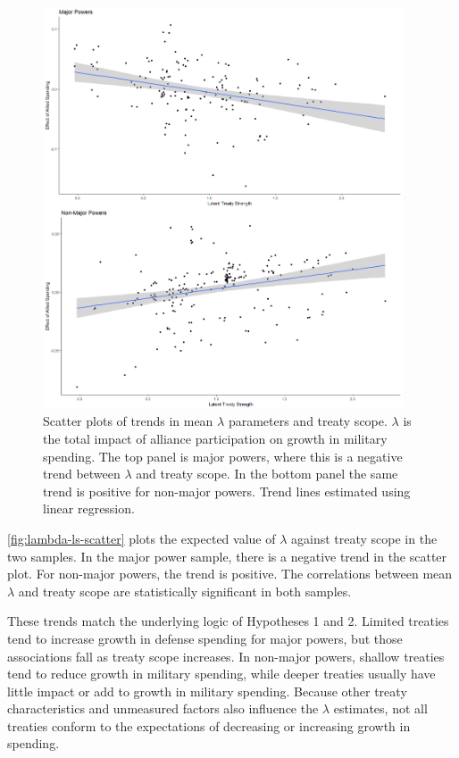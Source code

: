 \documentclass[12pt]{article}
\begin{document}
\begin{figure}[htbp]
	\centering
		\includegraphics[width=0.95\textwidth]{../figures/lambda-ls-scatter.png}
	\caption{Scatter plots of trends in mean $\lambda$ parameters and treaty scope. $\lambda$ is the total impact of alliance participation on growth in military spending. The top panel is major powers, where this is a negative trend between $\lambda$ and treaty scope. In the bottom panel the same trend is positive for non-major powers. Trend lines estimated using linear regression.}
	\label{fig:lambda-ls-scatter}
\end{figure}


\autoref{fig:lambda-ls-scatter} plots the expected value of $\lambda$ against treaty scope in the two samples. 
In the major power sample, there is a negative trend in the scatter plot.
For non-major powers, the trend is positive.
The correlations between mean $\lambda$ and treaty scope are statistically significant in both samples. 


These trends match the underlying logic of Hypotheses 1 and 2. 
Limited treaties tend to increase growth in defense spending for major powers, but those associations fall as treaty scope increases. 
In non-major powers, shallow treaties tend to reduce growth in military spending, while deeper treaties usually have little impact or add to growth in military spending. 
Because other treaty characteristics and unmeasured factors also influence the $\lambda$ estimates, not all treaties conform to the expectations of decreasing or increasing growth in spending. 
\end{document}
